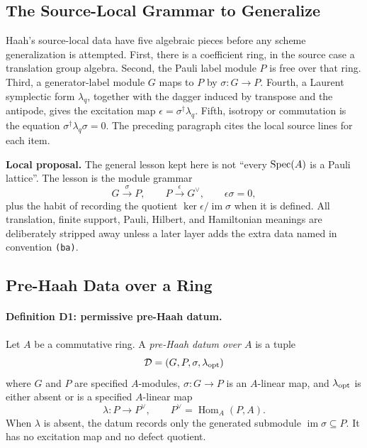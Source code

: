 \subsection{The Source-Local Grammar to Generalize}

Haah's source-local data have five algebraic pieces before any scheme
generalization is attempted.  First, there is a coefficient ring, in the source
case a translation group algebra.  Second, the Pauli label module \(P\) is free
over that ring.  Third, a generator-label module \(G\) maps to \(P\) by
\(\sigma:G\to P\).  Fourth, a Laurent symplectic form \(\lambda_q\), together
with the dagger induced by transpose and the antipode, gives the excitation
map \(\epsilon=\sigma^\dagger\lambda_q\).  Fifth, isotropy or commutation is
the equation \(\sigma^\dagger\lambda_q\sigma=0\).  The preceding paragraph
cites the local source lines for each item.

\textbf{Local proposal.}  The general lesson kept here is not ``every
\(\operatorname{Spec}(A)\) is a Pauli lattice''.  The lesson is the module grammar
\[
  G \xrightarrow{\sigma} P,\qquad
  P \xrightarrow{\epsilon} G^\vee,\qquad
  \epsilon\sigma=0,
\]
plus the habit of recording the quotient \(\ker\epsilon/\operatorname{im}\sigma\)
when it is defined.  All translation, finite support, Pauli, Hilbert, and
Hamiltonian meanings are deliberately stripped away unless a later layer adds
the extra data named in convention \texttt{(ba)}.

\subsection{Pre-Haah Data over a Ring}

\paragraph{Definition D1: permissive pre-Haah datum.}
Let \(A\) be a commutative ring.  A \emph{pre-Haah datum over \(A\)} is a tuple
\[
  \mathcal D=(G,P,\sigma,\lambda_{\rm opt})
\]
where \(G\) and \(P\) are specified \(A\)-modules, \(\sigma:G\to P\) is an
\(A\)-linear map, and \(\lambda_{\rm opt}\) is either absent or is a specified
\(A\)-linear map
\[
  \lambda:P\to P^\vee,\qquad P^\vee=\operatorname{Hom}_A(P,A).
\]
When \(\lambda\) is absent, the datum records only the generated submodule
\(\operatorname{im}\sigma\subseteq P\).  It has no excitation map and no defect
quotient.

